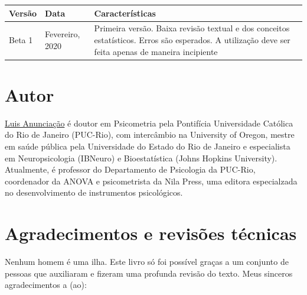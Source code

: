 \documentclass[
]{book}
\begin{document}
\begin{longtable}[]{@{}lll@{}}
\toprule
\begin{minipage}[b]{0.24\columnwidth}\raggedright
Versão\strut
\end{minipage} & \begin{minipage}[b]{0.34\columnwidth}\raggedright
Data\strut
\end{minipage} & \begin{minipage}[b]{0.34\columnwidth}\raggedright
Características\strut
\end{minipage}\tabularnewline
\midrule
\endhead
\begin{minipage}[t]{0.24\columnwidth}\raggedright
Beta 1\strut
\end{minipage} & \begin{minipage}[t]{0.34\columnwidth}\raggedright
Fevereiro, 2020\strut
\end{minipage} & \begin{minipage}[t]{0.34\columnwidth}\raggedright
Primeira versão. Baixa revisão textual e dos conceitos estatísticos. Erros são esperados. A utilização deve ser feita apenas de maneira incipiente\strut
\end{minipage}\tabularnewline
\bottomrule
\end{longtable}

\hypertarget{autor}{%
\section{Autor}\label{autor}}

\href{http://lattes.cnpq.br/3982200733248687}{Luis Anunciação} é doutor em Psicometria pela Pontifícia Universidade Católica do Rio de Janeiro (PUC-Rio), com intercâmbio na University of Oregon, mestre em saúde pública pela Universidade do Estado do Rio de Janeiro e especialista em Neuropsicologia (IBNeuro) e Bioestatística (Johns Hopkins University). Atualmente, é professor do Departamento de Psicologia da PUC-Rio, coordenador da ANOVA e psicometrista da Nila Press, uma editora especialzada no desenvolvimento de instrumentos psicológicos.

\hypertarget{agradecimentos-e-revisuxf5es-tuxe9cnicas}{%
\section{Agradecimentos e revisões técnicas}\label{agradecimentos-e-revisuxf5es-tuxe9cnicas}}

Nenhum homem é uma ilha. Este livro só foi possível graças a um conjunto de pessoas que auxiliaram e fizeram uma profunda revisão do texto. Meus sinceros agradecimentos a (ao):
\end{document}
